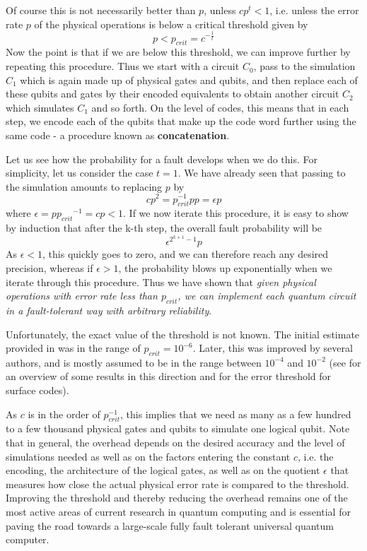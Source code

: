 \documentclass[a4paper, draft]{article}
\theoremstyle{own}
\theoremstyle{remark}
\begin{document}
Of course this is not necessarily better than $p$, unless $c p^t < 1$, i.e. unless the error rate $p$ of the physical operations is below a critical threshold given by 
$$
p < p_{crit} = c^{-\frac{1}{t}}
$$
Now the point is that if we are below this threshold, we can improve further by repeating this procedure. Thus we start with a circuit $C_0$, pass to the simulation $C_1$ which is again made up of physical gates and qubits, and then replace each of these qubits and gates by their encoded equivalents to obtain another circuit $C_2$ which simulates $C_1$ and so forth. On the level of codes, this means that in each step, we encode each of the qubits that make up the code word further using the same code - a procedure known as {\bf concatenation}.

Let us see how the probability for a fault develops when we do this. For simplicity, let us consider the case $t = 1$. We have already seen that passing to the simulation amounts to replacing $p$ by 
$$
c p^2 =  p_{crit}^{-1} p p = \epsilon p
$$
where $\epsilon = p{p_{crit}}^{-1} = cp < 1$. If we now iterate this procedure, it is easy to show by induction that after the k-th step, the overall fault probability will be
$$
\epsilon^{2^{k+1}-1} p 
$$
As $\epsilon < 1$, this quickly goes to zero, and we can therefore reach any desired precision, whereas if $\epsilon > 1$, the probability blows up exponentially when we iterate through this procedure. Thus we have shown that \emph{given physical operations with error rate less than $p_{crit}$, we can implement each quantum circuit in a fault-tolerant way with arbitrary reliability}. 

Unfortunately, the exact value of the threshold is not known. The initial estimate provided in \cite{AharonovOr} was in the range of $p_{crit} = 10^{-6}$. Later, this was improved by several authors, and is mostly assumed to be in the range between $10^{-4}$ and $10^{-2}$ (see \cite{Beginners} for an overview of some results in this direction and \cite{SurfaceCodes} for the error threshold for surface codes). 

As $c$ is in the order of $p_{crit}^{-1}$, this implies that we need as many as a few hundred to a few thousand physical gates and qubits to simulate one logical qubit. Note that in general, the overhead depends on the desired accuracy and the level of simulations needed as well as on the factors entering the constant $c$, i.e. the encoding, the architecture of the logical gates, as well as on the quotient $\epsilon$ that measures how close the actual physical error rate is compared to the threshold. Improving the threshold and thereby reducing the overhead remains one of the most active areas of current research in quantum computing and is essential for paving the road towards a large-scale fully fault tolerant universal quantum computer.
\end{document}
